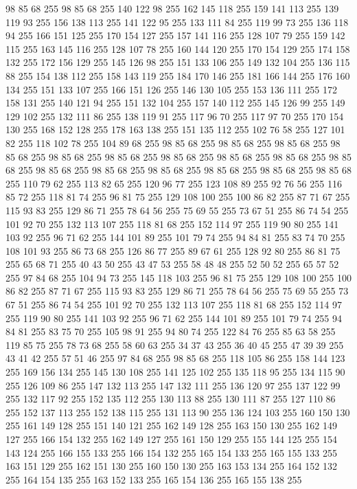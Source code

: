 98 85 68 255 98 85 68 255 140 122 98 255 162 145 118 255 159 141 113 255 139 119 93 255 156 138 113 255 141 122 95 255 133 111 84 255 119 99 73 255 136 118 94 255 166 151 125 255 170 154 127 255 157 141 116 255 128 107 79 255 159 142 115 255 163 145 116 255 128 107 78 255 160 144 120 255 170 154 129 255 174 158 132 255 172 156 129 255 145 126 98 255 151 133 106 255 149 132 104 255 136 115 88 255 154 138 112 255 158 143 119 255 184 170 146 255 181 166 144 255 176 160 134 255 151 133 107 255 166 151 126 255 146 130 105 255 153 136 111 255 172 158 131 255 140 121 94 255 151 132 104 255 157 140 112 255 145 126 99 255 149 129 102 255 132 111 86 255 138 119 91 255 117 96 70 255 117 97 70 255 170 154 130 255 168 152 128 255 178 163 138 255 151 135 112 255 102 76 58 255 127 101 82 255 118 102 78 255 104 89 68 255 98 85 68 255 98 85 68 255 98 85 68 255 98 85 68 255 98 85 68 255 98 85 68 255 98 85 68 255 98 85 68 255 98 85 68 255 98 85 68 255 98 85 68 255
98 85 68 255 98 85 68 255 98 85 68 255 98 85 68 255 98 85 68 255 110 79 62 255 113 82 65 255 120 96 77 255 123 108 89 255 92 76 56 255 116 85 72 255 118 81 74 255 96 81 75 255 129 108 100 255 100 86 82 255 87 71 67 255 115 93 83 255 129 86 71 255 78 64 56 255 75 69 55 255 73 67 51 255 86 74 54 255 101 92 70 255 132 113 107 255 118 81 68 255 152 114 97 255 119 90 80 255 141 103 92 255 96 71 62 255 144 101 89 255 101 79 74 255 94 84 81 255 83 74 70 255 108 101 93 255 86 73 68 255 126 86 77 255 89 67 61 255 128 92 80 255 86 81 75 255 65 68 71 255 40 43 50 255 43 47 53 255 58 48 48 255 52 50 52 255 65 57 52 255 97 84 68 255 104 94 73 255 145 118 103 255 96 81 75 255 129 108 100 255 100 86 82 255 87 71 67 255 115 93 83 255 129 86 71 255 78 64 56 255 75 69 55 255 73 67 51 255 86 74 54 255 101 92 70 255 132 113 107 255 118 81 68 255 152 114 97 255 119 90 80 255 141 103 92 255
96 71 62 255 144 101 89 255 101 79 74 255 94 84 81 255 83 75 70 255 105 98 91 255 94 80 74 255 122 84 76 255 85 63 58 255 119 85 75 255 78 73 68 255 58 60 63 255 34 37 43 255 36 40 45 255 47 39 39 255 43 41 42 255 57 51 46 255 97 84 68 255 98 85 68 255 118 105 86 255 158 144 123 255 169 156 134 255 145 130 108 255 141 125 102 255 135 118 95 255 134 115 90 255 126 109 86 255 147 132 113 255 147 132 111 255 136 120 97 255 137 122 99 255 132 117 92 255 152 135 112 255 130 113 88 255 130 111 87 255 127 110 86 255 152 137 113 255 152 138 115 255 131 113 90 255 136 124 103 255 160 150 130 255 161 149 128 255 151 140 121 255 162 149 128 255 163 150 130 255 162 149 127 255 166 154 132 255 162 149 127 255 161 150 129 255 155 144 125 255 154 143 124 255 166 155 133 255 166 154 132 255 165 154 133 255 165 155 133 255 163 151 129 255 162 151 130 255 160 150 130 255 163 153 134 255 164 152 132 255 164 154 135 255 163 152 133 255 165 154 136 255 165 155 138 255
